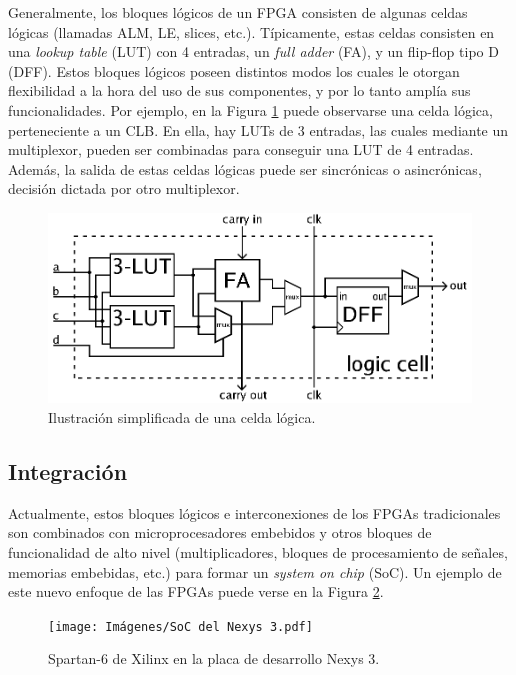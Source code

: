 Generalmente, los bloques lógicos de un FPGA consisten de algunas celdas lógicas (llamadas ALM, LE, slices, etc.). Típicamente, estas celdas consisten en una \emph{lookup table} (LUT) con 4 entradas, un \emph{full adder} (FA), y un flip-flop tipo D (DFF). Estos bloques lógicos poseen distintos modos los cuales le otorgan flexibilidad a la hora del uso de sus componentes, y por lo tanto amplía sus funcionalidades. Por ejemplo, en la Figura \ref{clb} puede observarse una celda lógica, perteneciente a un CLB. En ella, hay LUTs de 3 entradas, las cuales mediante un multiplexor, pueden ser combinadas para conseguir una LUT de 4 entradas. Además, la salida de estas celdas lógicas puede ser sincrónicas o asincrónicas, decisión dictada por otro multiplexor.

\begin{figure}[hbt!]
    \centering
    \includegraphics[width=0.65\columnwidth]{Imágenes/Celda lógica de CLB.png}
    \caption{Ilustración simplificada de una celda lógica.}
    \label{clb}
\end{figure} 

\subsection{Integración}
\label{subseccion-nexys-3}

Actualmente, estos bloques lógicos e interconexiones de los FPGAs tradicionales son combinados con microprocesadores embebidos y otros bloques de funcionalidad de alto nivel (multiplicadores, bloques de procesamiento de señales, memorias embebidas, etc.) para formar un \emph{system on chip} (SoC). Un ejemplo de este nuevo enfoque de las FPGAs puede verse en la Figura \ref{spartan6}.   

\begin{figure}
    \vspace{-0pt}
    \begin{center}
      \texttt{[image: Imágenes/SoC del Nexys 3.pdf]}
    \end{center}
    \caption{Spartan-6 de Xilinx en la placa de desarrollo Nexys 3.}
    \label{spartan6}
  \end{figure}

